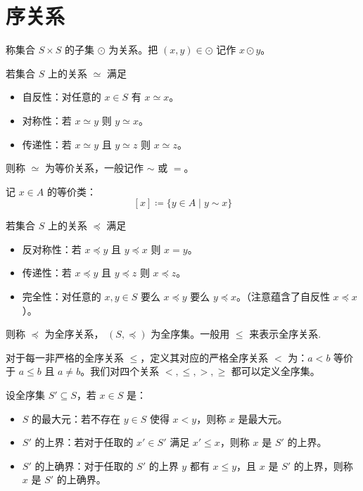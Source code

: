 \section{序关系}

称集合 $S\times S$ 的子集 $\odot$ 为关系。把 $(x,y) \in \odot$ 记作 $x \odot y$。

\begin{definition}[等价关系]
	若集合 $S$ 上的关系 $\simeq$ 满足

	\begin{itemize}
		\item 自反性：对任意的 $x\in S$ 有 $x \simeq x$。

		\item 对称性：若 $x \simeq y$ 则 $y \simeq x$。

		\item 传递性：若 $x \simeq y$ 且 $y \simeq z$ 则 $x \simeq z$。
	\end{itemize}

	则称 $\simeq$ 为等价关系，一般记作 $\sim$ 或 $=$。
\end{definition}

记 $x\in A$ 的等价类：
\[ [x] \coloneqq  \{y \in A \mid y \sim x\}\]

\begin{definition}[全序关系]
	若集合 $S$ 上的关系 $\preceq$ 满足

	\begin{itemize}
		\item 反对称性：若 $x \preceq y$ 且 $y \preceq x$ 则 $x = y$。

		\item 传递性：若 $x \preceq y$ 且 $y \preceq z$ 则 $x \preceq z$。

		\item 完全性：对任意的 $x,y\in S$ 要么 $x \preceq y$ 要么 $y \preceq x$。（注意蕴含了自反性 $x \preceq x$）。
	\end{itemize}
	则称 $\preceq$ 为全序关系， $(S,\preceq)$ 为全序集。一般用 $\leqslant$ 来表示全序关系.
\end{definition}

对于每一非严格的全序关系 $\leqslant$，定义其对应的严格全序关系 $<$ 为：$a < b$ 等价于 $a \leqslant b$ 且 $a \neq b$。我们对四个关系 $<, \leqslant, >, \geqslant$ 都可以定义全序集。

\begin{definition}
	设全序集 $S' \subseteq S$，若 $x \in S$ 是：

	\begin{itemize}
		\item $S$ 的最大元：若不存在 $y \in S$ 使得 $x < y$，则称 $x$ 是最大元。

		\item $S'$ 的上界：若对于任取的 $x' \in S'$ 满足 $x' \leqslant x$，则称 $x$ 是 $S'$ 的上界。

		\item $S'$ 的上确界：对于任取的 $S'$ 的上界 $y$ 都有 $x \leqslant y$，且 $x$ 是 $S'$ 的上界，则称 $x$ 是 $S'$ 的上确界。
	\end{itemize}
\end{definition}

